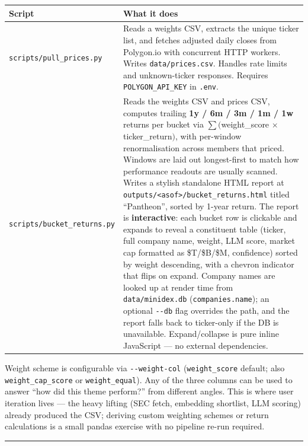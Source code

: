 \documentclass[11pt,a4paper,oneside]{article}
\begin{document}
\begin{tabular}{@{}p{3.5cm}p{11.5cm}@{}}
\toprule
\textbf{Script} & \textbf{What it does} \\
\midrule
\texttt{scripts/pull\_prices.py} & Reads a weights CSV, extracts the unique ticker list, and fetches adjusted daily closes from Polygon.io with concurrent HTTP workers. Writes \texttt{data/prices.csv}. Handles rate limits and unknown-ticker responses. Requires \texttt{POLYGON\_API\_KEY} in \texttt{.env}. \\
\addlinespace
\texttt{scripts/bucket\_returns.py} & Reads the weights CSV and prices CSV, computes trailing \textbf{1y / 6m / 3m / 1m / 1w} returns per bucket via $\sum($weight\_score $\times$ ticker\_return$)$, with per-window renormalisation across members that priced. Windows are laid out longest-first to match how performance readouts are usually scanned. Writes a stylish standalone HTML report at \texttt{outputs/<asof>/bucket\_returns.html} titled ``Pantheon'', sorted by 1-year return. The report is \textbf{interactive}: each bucket row is clickable and expands to reveal a constituent table (ticker, full company name, weight, LLM score, market cap formatted as \$T/\$B/\$M, confidence) sorted by weight descending, with a chevron indicator that flips on expand. Company names are looked up at render time from \texttt{data/minidex.db} (\texttt{companies.name}); an optional \texttt{-{}-db} flag overrides the path, and the report falls back to ticker-only if the DB is unavailable. Expand/collapse is pure inline JavaScript --- no external dependencies. \\
\bottomrule
\end{tabular}

\vspace{0.6em}
Weight scheme is configurable via \texttt{-{}-weight-col} (\texttt{weight\_score} default; also \texttt{weight\_cap\_score} or \texttt{weight\_equal}). Any of the three columns can be used to answer ``how did this theme perform?'' from different angles. This is where user iteration lives --- the heavy lifting (SEC fetch, embedding shortlist, LLM scoring) already produced the CSV; deriving custom weighting schemes or return calculations is a small pandas exercise with no pipeline re-run required.

\vspace{2em}
\hrule
\vspace{0.5em}
\end{document}
